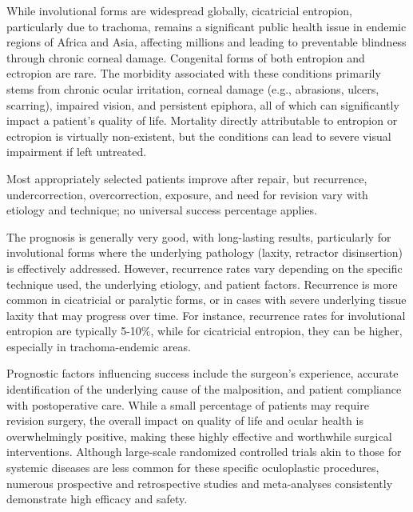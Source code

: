 While involutional forms are widespread globally, cicatricial entropion, particularly due to trachoma, remains a significant public health issue in endemic regions of Africa and Asia, affecting millions and leading to preventable blindness through chronic corneal damage. Congenital forms of both entropion and ectropion are rare. The morbidity associated with these conditions primarily stems from chronic ocular irritation, corneal damage (e.g., abrasions, ulcers, scarring), impaired vision, and persistent epiphora, all of which can significantly impact a patient's quality of life. Mortality directly attributable to entropion or ectropion is virtually non-existent, but the conditions can lead to severe visual impairment if left untreated.

Most appropriately selected patients improve after repair, but recurrence, undercorrection, overcorrection, exposure, and need for revision vary with etiology and technique; no universal success percentage applies.

The prognosis is generally very good, with long-lasting results, particularly for involutional forms where the underlying pathology (laxity, retractor disinsertion) is effectively addressed. However, recurrence rates vary depending on the specific technique used, the underlying etiology, and patient factors. Recurrence is more common in cicatricial or paralytic forms, or in cases with severe underlying tissue laxity that may progress over time. For instance, recurrence rates for involutional entropion are typically 5-10\%, while for cicatricial entropion, they can be higher, especially in trachoma-endemic areas. 

Prognostic factors influencing success include the surgeon's experience, accurate identification of the underlying cause of the malposition, and patient compliance with postoperative care. While a small percentage of patients may require revision surgery, the overall impact on quality of life and ocular health is overwhelmingly positive, making these highly effective and worthwhile surgical interventions. Although large-scale randomized controlled trials akin to those for systemic diseases are less common for these specific oculoplastic procedures, numerous prospective and retrospective studies and meta-analyses consistently demonstrate high efficacy and safety.

